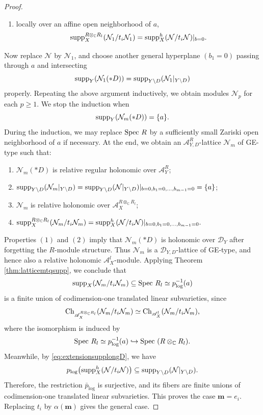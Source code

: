\documentclass{amsart}
\theoremstyle{plain}
\numberwithin{theorem}{section}
\theoremstyle{definition}
\theoremstyle{remark}
\theoremstyle{definition}
\newcommand{\C}{\mathbb{C}} %
\newcommand{\cN}{\mathcal{N}}
\newcommand{\bm}{\mathbf{m}}
\newcommand{\sA}{\mathscr{A}}
\newcommand{\shD}{\mathscr{D}}
\newcommand{\Spec}{\textup{Spec }}
\newcommand{\supp}{\textup{supp}}
\newcommand{\Ch}{\textup{Ch}}
\begin{document}
\begin{proof}
\begin{enumerate}[label=$(\arabic*)$]
    \item locally over an affine open neighborhood of $a$,
    \[
    \supp_X^{R\otimes_\C R_l}(\cN_1/t_i\cN_1)
    =
    \supp^h_X(\cN/t_i\cN)|_{b=0}.
    \]
\end{enumerate}

Now replace $\cN$ by $\cN_1$, and choose another general hyperplane $(b_1=0)$ passing through $a$ and intersecting
\[
\supp_Y(\cN_1(*D))
=
\supp_{Y\setminus D}(\cN_1|_{Y\setminus D})
\]
properly. Repeating the above argument inductively, we obtain modules $\cN_p$ for each $p\ge 1$. We stop the induction when
\[
\supp_Y(\cN_m(*D))=\{a\}.
\]
During the induction, we may replace $\Spec R$ by a sufficiently small Zariski open neighborhood of $a$ if necessary. At the end, we obtain an $\sA^R_{Y,D}$-lattice $\cN_m$ of GE-type such that:
\begin{enumerate}[label=$(\arabic*)$]
    \item $\cN_m(*D)$ is relative regular holonomic over $\sA^R_Y$;
    \item
    $
    \supp_{Y\setminus D}(\cN_m|_{Y\setminus D})
    =
    \supp_{Y\setminus D}(\cN|_{Y\setminus D})|_{b=0,b_1=0,\dots,b_{m-1}=0}
    =
    \{a\}$;
    \item $\cN_m$ is relative holonomic over $\sA_X^{R\otimes_\C R_l}$;
    \item
    $
    \supp_X^{R\otimes_\C R_l}(\cN_m/t_i\cN_m)
    =
    \supp^h_X(\cN/t_i\cN)|_{b=0,b_1=0,\dots,b_{m-1}=0}.
    $
\end{enumerate}

Properties $(1)$ and $(2)$ imply that $\cN_m(*D)$ is holonomic over $\shD_Y$ after forgetting the $R$-module structure. Thus $\cN_m$ is a $\shD_{Y,D}$-lattice of GE-type, and hence also a relative holonomic $\sA_X^l$-module. Applying Theorem \ref{thm:latticemtqsupp}, we conclude that
\[
\supp_X(\cN_m/t_i\cN_m)
\subseteq
\Spec R_l\simeq p_{\log}^{-1}(a)
\]
is a finite union of codimension-one translated linear subvarieties, since
\[
\Ch_{\sA_X^{R\otimes_\C R_l}}(\cN_m/t_i\cN_m)
\simeq
\Ch_{\sA_X^l}(\cN_m/t_i\cN_m),
\]
where the isomorphism is induced by
\[
\Spec R_l\simeq p_{\log}^{-1}(a)\hookrightarrow \Spec(R\otimes_\C R_l).
\]
Meanwhile, by \eqref{eq:extensionsupplongD}, we have
\[
p_{\log}\big(\supp^h_X(\cN/t_i\cN)\big)
\subseteq
\supp_{Y\setminus D}(\cN|_{Y\setminus D}).
\]
Therefore, the restriction $\bar p_{\log}$ is surjective, and its fibers are finite unions of codimension-one translated linear subvarieties. This proves the case $\bm=e_i$. Replacing $t_i$ by $\alpha(\bm)$ gives the general case.
\end{proof}
\end{document}
